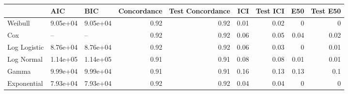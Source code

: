 \begin{table*}
\centering
\label{tab:afr_models}
\begin{tabular}{lllrrrrrr}
\toprule
 & AIC & BIC & Concordance & Test Concordance & ICI & Test ICI & E50 & Test E50 \\
\midrule
Weibull & 9.05e+04 & 9.05e+04 & 0.92 & 0.92 & 0.01 & 0.02 & 0 & 0 \\
Cox & -- & -- & 0.92 & 0.92 & 0.06 & 0.05 & 0.04 & 0.02 \\
Log Logistic & 8.76e+04 & 8.76e+04 & 0.92 & 0.92 & 0.06 & 0.03 & 0 & 0.01 \\
Log Normal & 1.14e+05 & 1.14e+05 & 0.91 & 0.91 & 0.08 & 0.08 & 0.01 & 0.01 \\
Gamma & 9.99e+04 & 9.99e+04 & 0.91 & 0.91 & 0.16 & 0.13 & 0.13 & 0.1 \\
Exponential & 7.93e+04 & 7.93e+04 & 0.92 & 0.92 & 0.04 & 0.04 & 0 & 0 \\
\bottomrule
\end{tabular}
\end{table*}
